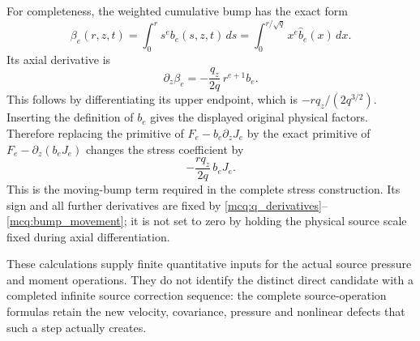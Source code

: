 For completeness, the weighted cumulative bump has the exact form
\[
 \beta_e(r,z,t)=\int_0^rs^eb_e(s,z,t)\,ds
              =\int_0^{r/\sqrt q}x^e\widehat b_e(x)\,dx .
\]
Its axial derivative is
\begin{equation}\label{mcq:bump_movement}
 \partial_z\beta_e
 =-\frac{q_z}{2q}\,r^{e+1}b_e .
\end{equation}
This follows by differentiating its upper endpoint, which is
\(-rq_z/(2q^{3/2})\). Inserting the definition of \(b_e\) gives
the displayed original physical factors. Therefore replacing the
primitive of \(F_e-b_e\partial_zJ_e\) by the exact primitive of
\(F_e-\partial_z(b_eJ_e)\) changes the stress coefficient by
\[
 -\frac{rq_z}{2q}\,b_eJ_e .
\]
This is the moving-bump term required in the complete stress construction.
Its sign and all further derivatives are fixed by
\eqref{mcq:q_derivatives}--\eqref{mcq:bump_movement}; it is not set to zero
by holding the physical source scale fixed during axial differentiation.

These calculations supply finite quantitative inputs for the actual
source pressure and moment operations. They do not identify the
distinct direct candidate with a completed infinite source correction
sequence: the complete source-operation formulas retain the new
velocity, covariance, pressure and nonlinear defects that such a step
actually creates.
